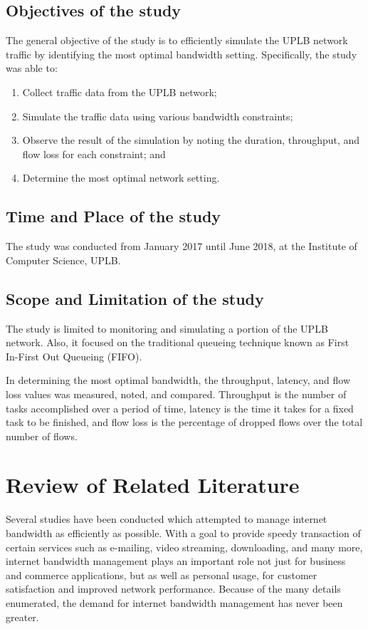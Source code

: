 \documentclass[journal]{IEEE/IEEEtran}
\begin{document}
\clearpage

\subsection{Objectives of the study}
The general objective of the study is to efficiently simulate the UPLB network traffic by identifying the most optimal bandwidth setting. Specifically, the study was able to:

\begin{enumerate}
\item Collect traffic data from the UPLB network;
\item Simulate the traffic data using various bandwidth constraints;
\item Observe the result of the simulation by noting the duration, throughput, and flow loss for  each constraint; and
\item Determine the most optimal network setting.
\end{enumerate}

\subsection{Time and Place of the study}
  The study was conducted from January 2017 until June 2018, at the Institute of Computer Science, UPLB.

\subsection{Scope and Limitation of the study}
The study is limited to monitoring and simulating a portion of the UPLB network. Also, it focused on the traditional queueing technique known as First In-First Out Queueing (FIFO).

In determining the most optimal bandwidth, the throughput, latency, and flow loss values was measured, noted, and compared. Throughput is the number of tasks accomplished over a period of time, latency is the time it takes for a fixed task to be finished, and flow loss is the percentage of dropped flows over the total number of flows.

\section{Review of Related Literature}
Several studies have been conducted which attempted to manage internet bandwidth as efficiently as possible. With a goal to provide speedy transaction of certain services such as e-mailing, video streaming, downloading, and many more, internet bandwidth management plays an important role not just for business and commerce applications, but as well as personal usage, for customer satisfaction and improved network performance. Because of the many details enumerated, the demand for internet bandwidth management has never been greater.
\end{document}

